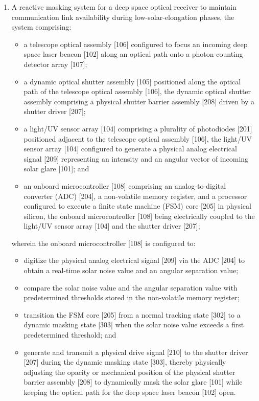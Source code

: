 \documentclass[12pt,a4paper]{article}
\begin{document}
\begin{enumerate}
    \item A reactive masking system for a deep space optical receiver to maintain communication link availability during low-solar-elongation phases, the system comprising:
    \begin{itemize}
        \item a telescope optical assembly [106] configured to focus an incoming deep space laser beacon [102] along an optical path onto a photon-counting detector array [107];
        \item a dynamic optical shutter assembly [105] positioned along the optical path of the telescope optical assembly [106], the dynamic optical shutter assembly comprising a physical shutter barrier assembly [208] driven by a shutter driver [207];
        \item a light/UV sensor array [104] comprising a plurality of photodiodes [201] positioned adjacent to the telescope optical assembly [106], the light/UV sensor array [104] configured to generate a physical analog electrical signal [209] representing an intensity and an angular vector of incoming solar glare [101]; and
        \item an onboard microcontroller [108] comprising an analog-to-digital converter (ADC) [204], a non-volatile memory register, and a processor configured to execute a finite state machine (FSM) core [205] in physical silicon, the onboard microcontroller [108] being electrically coupled to the light/UV sensor array [104] and the shutter driver [207];
    \end{itemize}
    wherein the onboard microcontroller [108] is configured to:
    \begin{itemize}
        \item digitize the physical analog electrical signal [209] via the ADC [204] to obtain a real-time solar noise value and an angular separation value;
        \item compare the solar noise value and the angular separation value with predetermined thresholds stored in the non-volatile memory register;
        \item transition the FSM core [205] from a normal tracking state [302] to a dynamic masking state [303] when the solar noise value exceeds a first predetermined threshold; and
        \item generate and transmit a physical drive signal [210] to the shutter driver [207] during the dynamic masking state [303], thereby physically adjusting the opacity or mechanical position of the physical shutter barrier assembly [208] to dynamically mask the solar glare [101] while keeping the optical path for the deep space laser beacon [102] open.
    \end{itemize}


\end{enumerate}
\end{document}
